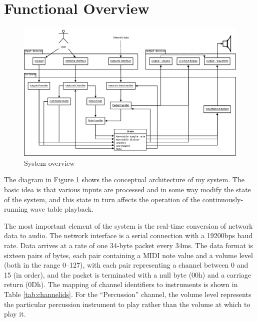 \section{Functional Overview}

\begin{nowordcount}
\begin{figure}[htbp]
\centering
\includegraphics[totalheight=0.55\textheight,angle=90]{images/overview.png}
\caption{System overview}\label{fig:systemoverview}
\end{figure}
\end{nowordcount}

The diagram in Figure \ref{fig:systemoverview} shows the conceptual architecture of my system.  The 
basic idea is that various inputs are processed and in some way modify the state of the system, and 
this state in turn affects the operation of the continuously-running wave table playback.

The most important element of the system is the real-time conversion of network data to audio.  The 
network interface is a serial connection with a 19200bps baud rate.  Data arrives at a rate of one 
34-byte packet every 34ms.  The data format is sixteen pairs of bytes, each pair containing a MIDI 
note value and a volume level (both in the range 0--127), with each pair representing a channel 
between 0 and 15 (in order), and the packet is terminated with a null byte (00h) and a carriage 
return (0Dh).  The mapping of channel identifiers to instruments is shown in Table 
\ref{tab:channelids}.  For the ``Percussion'' channel, the volume level represents the particular 
percussion instrument to play rather than the volume at which to play it.

